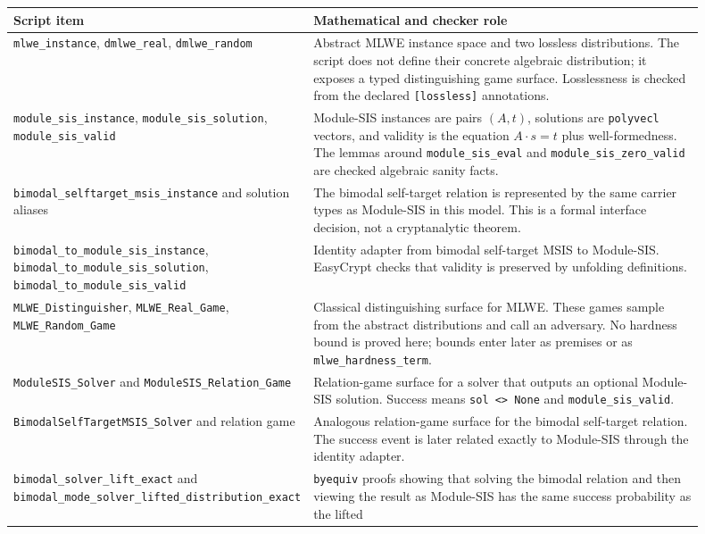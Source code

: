 \documentclass[11pt]{report}
\DeclareRobustCommand{\ec}[1]{\ifmmode\text{\nolinkurl{#1}}\else\nolinkurl{#1}\fi}
\theoremstyle{definition}
\theoremstyle{plain}
\begin{document}
\begin{longtable}{p{0.30\linewidth}p{0.60\linewidth}}
\toprule
\textbf{Script item} & \textbf{Mathematical and checker role} \\
\midrule
\ec{mlwe\_instance},
\ec{dmlwe\_real},
\ec{dmlwe\_random} &
Abstract MLWE instance space and two lossless distributions.  The script does
not define their concrete algebraic distribution; it exposes a typed
distinguishing game surface.  Losslessness is checked from the declared
\ec{[lossless]} annotations. \\
\ec{module\_sis\_instance},
\ec{module\_sis\_solution},
\ec{module\_sis\_valid} &
Module-SIS instances are pairs \((A,t)\), solutions are \ec{polyvecl} vectors,
and validity is the equation \(A\cdot s=t\) plus well-formedness.  The lemmas
around \ec{module\_sis\_eval} and \ec{module\_sis\_zero\_valid} are checked
algebraic sanity facts. \\
\ec{bimodal\_selftarget\_msis\_instance} and solution aliases &
The bimodal self-target relation is represented by the same carrier types as
Module-SIS in this model.  This is a formal interface decision, not a
cryptanalytic theorem. \\
\ec{bimodal\_to\_module\_sis\_instance},
\ec{bimodal\_to\_module\_sis\_solution},
\ec{bimodal\_to\_module\_sis\_valid} &
Identity adapter from bimodal self-target MSIS to Module-SIS.  EasyCrypt checks
that validity is preserved by unfolding definitions. \\
\ec{MLWE\_Distinguisher},
\ec{MLWE\_Real\_Game},
\ec{MLWE\_Random\_Game} &
Classical distinguishing surface for MLWE.  These games sample from the
abstract distributions and call an adversary.  No hardness bound is proved
here; bounds enter later as premises or as \ec{mlwe\_hardness\_term}. \\
\ec{ModuleSIS\_Solver} and
\ec{ModuleSIS\_Relation\_Game} &
Relation-game surface for a solver that outputs an optional Module-SIS
solution.  Success means \ec{sol <> None} and \ec{module\_sis\_valid}. \\
\ec{BimodalSelfTargetMSIS\_Solver} and relation game &
Analogous relation-game surface for the bimodal self-target relation.  The
success event is later related exactly to Module-SIS through the identity
adapter. \\
\ec{bimodal\_solver\_lift\_exact} and
\ec{bimodal\_mode\_solver\_lifted\_distribution\_exact} &
\ec{byequiv} proofs showing that solving the bimodal relation and then viewing
the result as Module-SIS has the same success probability as the lifted

\end{longtable}
\end{document}
